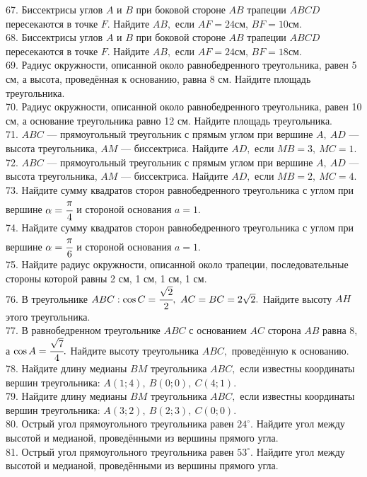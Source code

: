 67. Биссектрисы углов $A$ и $B$ при боковой стороне $AB$ трапеции $ABCD$ пересекаются в точке $F.$ Найдите $AB,$ если $AF=24$см, $BF=10$см.\\
68. Биссектрисы углов $A$ и $B$ при боковой стороне $AB$ трапеции $ABCD$ пересекаются в точке $F.$ Найдите $AB,$ если $AF=24$см, $BF=18$см.\\
69. Радиус окружности, описанной около равнобедренного треугольника, равен 5 см, а высота, проведённая к основанию, равна 8 см. Найдите площадь треугольника.\\
70. Радиус окружности, описанной около равнобедренного треугольника, равен 10 см, а основание треугольника равно 12 см. Найдите площадь треугольника.\\
71. $ABC$ --- прямоугольный треугольник с прямым углом при вершине $A,\ AD$ --- высота треугольника, $AM$ --- биссектриса. Найдите $AD,$ если $MB=3,\ MC=1.$\\
72. $ABC$ --- прямоугольный треугольник с прямым углом при вершине $A,\ AD$ --- высота треугольника, $AM$ --- биссектриса. Найдите $AD,$ если $MB=2,\ MC=4.$\\
73. Найдите сумму квадратов сторон равнобедренного треугольника с углом при вершине $\alpha=\cfrac{\pi}{4}$ и стороной основания $a=1.$\\
74. Найдите сумму квадратов сторон равнобедренного треугольника с углом при вершине $\alpha=\cfrac{\pi}{6}$ и стороной основания $a=1.$\\
75. Найдите радиус окружности, описанной около трапеции, последовательные стороны которой равны 2 см, 1 см, 1 см, 1 см.\\
76. В треугольнике $ABC: \cos C=\cfrac{\sqrt{2}}{2},\ AC=BC=2\sqrt{2}.$ Найдите высоту $AH$ этого треугольника.\\
77. В равнобедренном треугольнике $ABC$ с основанием $AC$ сторона $AB$ равна 8, а $\cos A=\cfrac{\sqrt{7}}{4}.$ Найдите высоту треугольника $ABC,$ проведённую к основанию.\\
78. Найдите длину медианы $BM$ треугольника $ABC,$ если известны координаты вершин треугольника: $A(1;4),\ B(0;0),\ C(4;1).$\\
79. Найдите длину медианы $BM$ треугольника $ABC,$ если известны координаты вершин треугольника: $A(3;2),\ B(2;3),\ C(0;0).$\\
80. Острый угол прямоугольного треугольника равен $24^\circ.$ Найдите угол между высотой и медианой, проведёнными из вершины прямого угла.\\
81. Острый угол прямоугольного треугольника равен $53^\circ.$ Найдите угол между высотой и медианой, проведёнными из вершины прямого угла.\\
